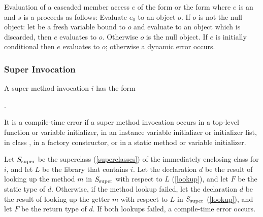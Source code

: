 \documentclass[makeidx]{article}
\begin{document}
{\LMHash{}%
Evaluation of a cascaded member access $e$
of the form  or the form 
where $e$ is an  and
$s$ is a 
proceeds as follows:
Evaluate $e_0$ to an object $o$.
If $o$ is not the null object:
let  be a fresh variable bound to $o$ and
evaluate  to an object which is discarded,
then $e$ evaluates to $o$.
Otherwise $o$ is the null object.
If $e$ is initially conditional then $e$ evaluates to $o$;
otherwise a dynamic error occurs.


\subsubsection{Super Invocation}


\LMHash{}%
A super method invocation $i$ has the form

.


\LMHash{}%
It is a compile-time error if a super method invocation occurs in a top-level function or variable initializer,
in an instance variable initializer or initializer list,
in class ,
in a factory constructor,
or in a static method or variable initializer.

{ %

\def\SuperClass{\ensuremath{S_{\mbox{\scriptsize{}super}}}}

\LMHash{}%
Let \SuperClass{} be the superclass (\ref{superclasses})
of the immediately enclosing class for $i$,
and let $L$ be the library that contains $i$.
Let the declaration $d$ be
the result of looking up the method $m$ in \SuperClass{}
with respect to $L$ (\ref{lookup}),
and let $F$ be the static type of $d$.
Otherwise, if the method lookup failed,
let the declaration $d$ be the result of looking up
the getter $m$ with respect to $L$ in \SuperClass{}
(\ref{lookup}),
and let $F$ be the return type of $d$.
If both lookups failed, a compile-time error occurs.

}}
\end{document}
